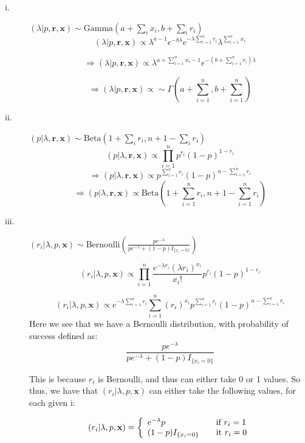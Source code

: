 \documentclass[12pt]{article}
\begin{document}
\begin{description}
\begin{description}
\begin{description}
\item[i.] $(\lambda | p, \textbf{r}, \textbf{x}) \sim \text{Gamma}(a + \sum_i x_i, b+\sum_i r_i)$\\
\[(\lambda | p, \textbf{r}, \textbf{x}) \propto \lambda^{a - 1} e^{-b\lambda} e^{-\lambda \sum_{i = 1}^n r_i} \lambda^{\sum_{i = 1}^n x_i} \]

\[\Rightarrow (\lambda | p, \textbf{r}, \textbf{x}) \propto \lambda^{a + \sum_{i =1}^n x_i  - 1} e^{-(b + \sum_{i = 1}^n r_i)\lambda}\]

\[\Rightarrow (\lambda | p, \textbf{r}, \textbf{x}) \propto \sim \Gamma \left(a + \sum_{i = 1}^n, b + \sum_{i = 1}^n\right)\]
\item[ii.] $(p| \lambda, \textbf{r}, \textbf{x}) \sim \text{Beta}(1 + \sum_i r_i, n + 1 - \sum_i r_i)$ \\
\[(p| \lambda, \textbf{r}, \textbf{x}) \propto \prod_{i = 1}^n p^{r_i} (1 - p)^{1 - r_i}\]
\[\Rightarrow (p| \lambda, \textbf{r}, \textbf{x}) \propto p^{\sum_{i = 1}^n r_i} (1 - p)^{n - \sum_{i = 1}^n r_i}\]
\[\Rightarrow (p| \lambda, \textbf{r}, \textbf{x}) \propto \text{Beta} \left (1 + \sum_{i = 1}^n r_i, n + 1 - \sum_{i=1}^n r_i\right)\]


\item[iii.] $(r_i | \lambda, p, \textbf{x}) \sim \text{Bernoulli} \left(\frac{pe^{-\lambda}}{pe^{-\lambda} + (1 - p) I_{\{x_i = 0\}}} \right)$

\[(r_i | \lambda, p, \textbf{x}) \propto \prod_{i = 1}^n \frac{e^{-\lambda r_i}(\lambda r_i)^{x_i}}{x_i!} p^{r_i} (1 - p)^{1 - r_i} \]

\[(r_i | \lambda, p, \textbf{x}) \propto  e^{-\lambda \sum_{i = 1}^n r_i} \sum_{i = 1}^n(r_i)^{x_i}p^{\sum_{i = 1}^n r_i} (1 - p)^{n - \sum_{i = 1}^n r_i}\]
Here we see that we have a Bernoulli distribution, with probability of success defined as:
\[\frac{pe^{-\lambda}}{pe^{-\lambda} + (1 - p) I_{\{x_i = 0\}}}\]

This is because $r_i$ is Bernoulli, and thus can either take 0 or 1 values. So thus, we have that $(r_i | \lambda, p, \textbf{x})$ can either take the following values, for each given i:

\[(r_i | \lambda, p, \textbf{x})   = \left\{ 
\begin{array}{l l}
 e^{-\lambda}p & \quad \text{if } r_i = 1\\
 (1 - p)I_{\{x_i = 0\}}& \quad \text{it } r_i = 0
\end{array} \right.\]


\end{description}
\end{description}
\end{description}
\end{document}
